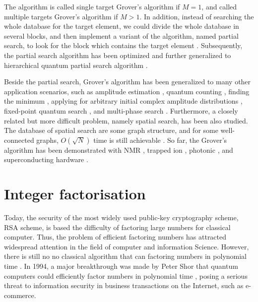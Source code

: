 \documentclass[aps,pra,twocolumn,superscriptaddress]{revtex4-1}
\begin{document}
The algorithm is called single target Grover's algorithm if $M=1$, and called multiple targets Grover's algorithm if $M>1$. In addition, instead of searching the whole database for the target element, we could divide the whole database in several blocks, and then implement a variant of the algorithm, named partial search, to look for the block which contains the target element \cite{grover2005acm}. Subsequently, the partial search algorithm has been optimized \cite{choi2007quantum, korepin2005optimization, korepin2006quest, korepin2006group} and further generalized to hierarchical quantum partial search algorithm \cite{korepin2009quantum, korepin2007hierarchical}.

Beside the partial search, Grover's algorithm has been generalized to many other application scenarios, such as amplitude estimation \cite{brassard2002quantum}, quantum counting \cite{boyer1996tight,brassard1998quantum, mosca1998quantum}, finding the minimum \cite{durr1996quantum, nayak1999quantum, kowada2008new}, applying for arbitrary initial complex amplitude distributions \cite{biham1999grover}, fixed-point quantum search \cite{grover2005fixed,tulsi2005new,yoder2014fixed}, and multi-phase search \cite{tan2014quantum}. Furthermore, a closely related but more difficult problem, namely spatial search, has been also studied. The database of spatial search are some graph structure, and for some well-connected graphs, $O(\sqrt{N})$ time is still achievable \cite{childs2004spatial,chakraborty2016spatial,wong2016quantum,janmark2014global,meyer2015connectivity,wong2016spatial}. So far, the Grover's algorithm has been demonstrated with NMR \cite{chuang1998experimental}, trapped ion \cite{brickman2005implementation}, photonic \cite{walther2005experimental}, and superconducting hardware \cite{dicarlo2009demonstration}.

\section{Integer factorisation}

Today, the security of the most widely used public-key cryptography scheme, RSA scheme, is based the difficulty of factoring large numbers for classical computer. Thus, the problem of efficient factoring numbers has attracted widespread attention in the field of computer and information Science. However, there is still no no classical algorithm that can factoring numbers in polynomial time \cite{pollard1974theorems}. In 1994, a major breakthrough was made by Peter Shor that quantum computers could efficiently factor numbers in polynomial time \cite{shor1997polynomial,shor1994algorithms}, posing a serious threat to information security in business transactions on the Internet, such as e-commerce.
\end{document}
